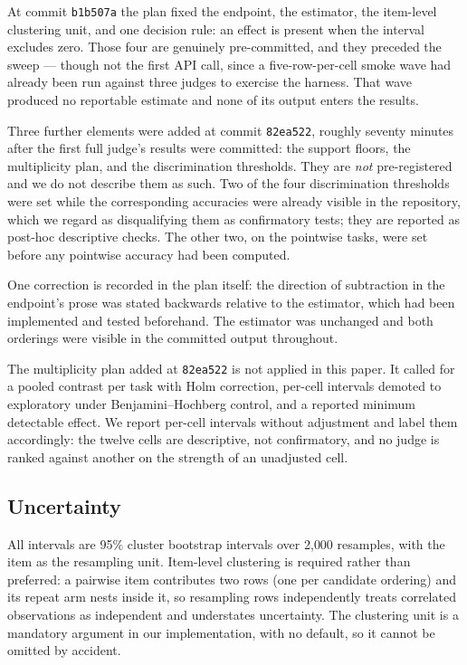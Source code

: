 \documentclass[11pt]{article}          %
\begin{document}
At commit \texttt{b1b507a} the plan fixed the endpoint, the estimator, the
item-level clustering unit, and one decision rule: an effect is present when the
interval excludes zero. Those four are genuinely pre-committed, and they preceded
the sweep --- though not the first API call, since a five-row-per-cell smoke wave
had already been run against three judges to exercise the harness. That wave
produced no reportable estimate and none of its output enters the results.

Three further elements were added at commit \texttt{82ea522}, roughly seventy
minutes after the first full judge's results were committed: the support floors,
the multiplicity plan, and the discrimination thresholds. They are \emph{not}
pre-registered and we do not describe them as such. Two of the four
discrimination thresholds were set while the corresponding accuracies were
already visible in the repository, which we regard as disqualifying them as
confirmatory tests; they are reported as post-hoc descriptive checks. The other
two, on the pointwise tasks, were set before any pointwise accuracy had been
computed.

One correction is recorded in the plan itself: the direction of subtraction in
the endpoint's prose was stated backwards relative to the estimator, which had
been implemented and tested beforehand. The estimator was unchanged and both
orderings were visible in the committed output throughout.

The multiplicity plan added at \texttt{82ea522} is not applied in this paper. It
called for a pooled contrast per task with Holm correction, per-cell intervals
demoted to exploratory under Benjamini--Hochberg control, and a reported minimum
detectable effect. We report per-cell intervals without adjustment and label
them accordingly: the twelve cells are descriptive, not confirmatory, and no
judge is ranked against another on the strength of an unadjusted cell.

\subsection{Uncertainty}

All intervals are 95\% cluster bootstrap intervals over 2{,}000 resamples, with
the item as the resampling unit. Item-level clustering is required rather than
preferred: a pairwise item contributes two rows (one per candidate ordering) and
its repeat arm nests inside it, so resampling rows independently treats
correlated observations as independent and understates uncertainty. The
clustering unit is a mandatory argument in our implementation, with no default,
so it cannot be omitted by accident.
\end{document}

